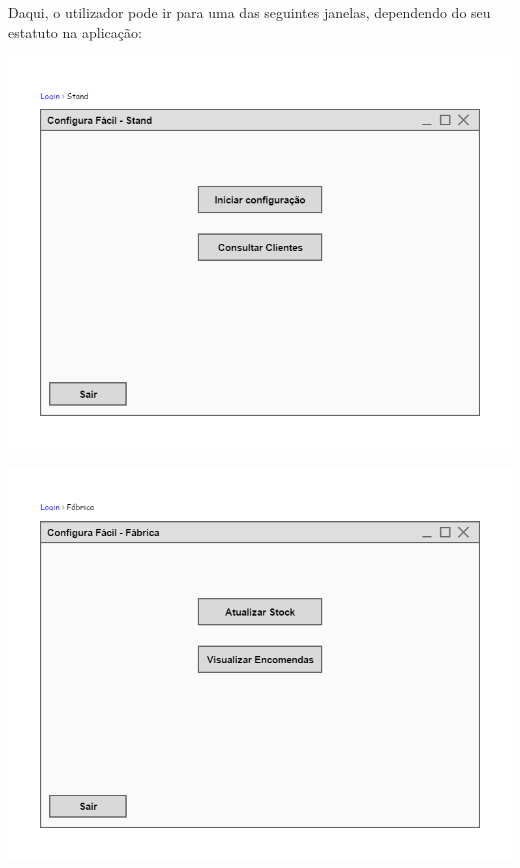 \documentclass[11pt]{article} %
\begin{document}
Daqui, o utilizador pode ir para uma das seguintes janelas, dependendo do seu estatuto na aplicação:

\begin{center}
 	\includegraphics[width = 5.5in]{configura_fcil_stand.png}

 	\includegraphics[width = 5.5in]{configura_fcil_fbrica.png}


\end{center}
\end{document}
